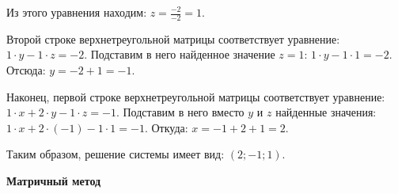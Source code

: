 \documentclass[10pt]{article}
\numberwithin{primer}{section}
\numberwithin{equation}{section}
\begin{document}
Из этого уравнения находим: $z=\tfrac{-2}{-2}=1$.

Второй строке верхнетреугольной матрицы соответствует уравнение: $1\cdot y-1\cdot z=-2$. Подставим в него найденное значение $z=1$:
$1\cdot y-1\cdot 1=-2$. Отсюда: $y=-2+1=-1$.

Наконец, первой строке верхнетреугольной матрицы соответствует уравнение: $1\cdot x+2\cdot y-1\cdot z=-1$. Подставим в него вместо $y$ и $z$
найденные значения: $1\cdot x+2\cdot(-1)-1\cdot1=-1$. Откуда: $x=-1+2+1=2$.

Таким образом, решение системы имеет вид: $\left(2;-1;1\right)$.

\begin{center}
	\textbf{Матричный метод}
\end{center}\vspace*{-0.5cm}
\end{document}
